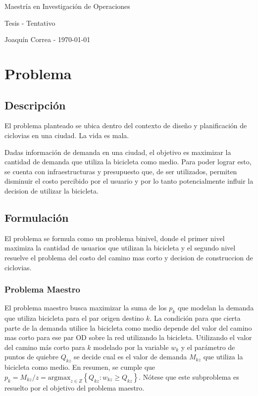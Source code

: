 \documentclass{article}
\begin{document}
  \begin{center}
    {\sc \large Maestría en Investigación de Operaciones}
    
    {\sc \large Tesis - Tentativo}
    \linebreak

    {\rm Joaquín Correa - \today}
  \end{center}

  \section*{Problema}

  \subsection*{Descripción}

  El problema planteado se ubica dentro del contexto de diseño y planificación de ciclovias en una ciudad. La vida es mala.

  Dadas información de demanda en una ciudad, el objetivo es maximizar la cantidad de demanda que utiliza la bicicleta como medio. Para poder lograr esto, se cuenta con infraestructuras y presupuesto que, de ser utilizados, permiten disminuir el costo percibido por el usuario y por lo tanto potencialmente influir la decision de utilizar la bicicleta.

  \subsection*{Formulación}

  El problema se formula como un problema binivel, donde el primer nivel maximiza la cantidad de usuarios que utilizan la bicicleta y el segundo nivel resuelve el problema del costo del camino mas corto y decision de construccion de ciclovias.

  \subsubsection*{Problema Maestro}

  El problema maestro busca maximizar la suma de los $p_k$ que modelan la demanda que utiliza bicicleta para el par origen destino $k$. La condición para que cierta parte de la demanda utilice la bicicleta como medio depende del valor del camino mas corto para ese par OD sobre la red utilizando la bicicleta. Utilizando el valor del camino más corto para $k$ modelado por la variable $w_k$ y el parámetro de puntos de quiebre $Q_{kz}$ se decide cual es el valor de demanda $M_{kz}$ que utiliza la bicicleta como medio. En resumen, se cumple que $p_k = M_{kz} / z = \text{argmax}_{z \in Z} \left\{ Q_{kz} : w_{kz} \geq Q_{kz} \right\}$. Nótese que este subproblema es resuelto por el objetivo del problema maestro.
\end{document}
